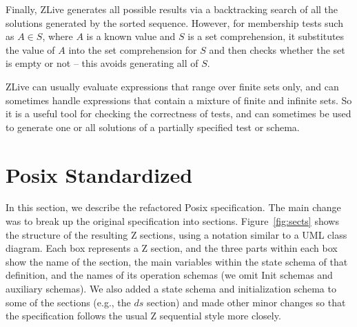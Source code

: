 \documentclass{llncs}
\begin{document}
Finally, ZLive generates all possible results via a backtracking
search of all the solutions generated by the sorted sequence.
However, for membership tests such as $A \in S$, where $A$ is a known
value and $S$ is a set comprehension, it substitutes the value of $A$
into the set comprehension for $S$ and then checks whether the set is
empty or not -- this avoids generating all of $S$.

ZLive can usually evaluate expressions that range over finite sets
only, and can sometimes handle expressions that contain a mixture of
finite and infinite sets.  So it is a useful tool for checking the
correctness of tests, and can sometimes be used to generate one
or all solutions of a partially specified test or schema.


\section{Posix Standardized}\label{sect:posix}

In this section, we describe the refactored Posix specification.  The
main change was to break up the original specification into sections.
Figure~\ref{fig:sects} shows the structure of the resulting Z
sections, using a notation similar to a UML class diagram.  Each box
represents a Z section, and the three parts within each box show the
name of the section, the main variables within the state schema of
that definition, and the names of its operation schemas (we omit Init
schemas and auxiliary schemas).  We also added a state schema and
initialization schema to some of the sections (e.g., the $ds$ section)
and made other minor changes so that the specification follows the
usual Z sequential style more closely.
\end{document}
